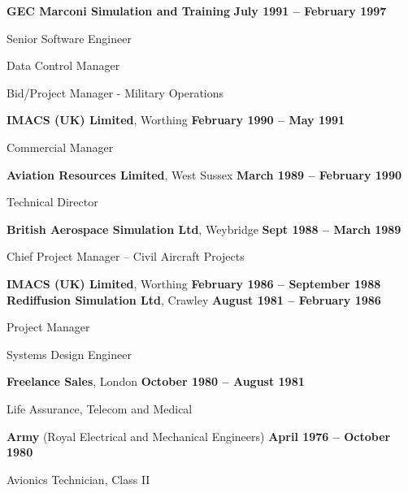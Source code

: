 \documentclass[10pt]{article}
\newenvironment{innerlist}[1][\enskip\textbullet]%
        {\begin{compactitem}[#1]}{\end{compactitem}}
\newcommand{\blankline}{\quad\pagebreak[2]}
\begin{document}
\textbf{GEC Marconi Simulation and Training}        \hfill \textbf{July 1991 -- February 1997}
\begin{innerlist}
\item Senior Software Engineer
\item Data Control Manager
\item Bid/Project Manager - Military Operations
\end{innerlist}
\blankline

\textbf{IMACS (UK) Limited}, Worthing        \hfill \textbf{February 1990 -- May 1991}
\begin{innerlist}
\item Commercial Manager
\end{innerlist}
\blankline

\textbf{Aviation Resources Limited}, West Sussex        \hfill \textbf{March 1989 -- February 1990}
\begin{innerlist}
\item Technical Director
\end{innerlist}
\blankline

\textbf{British Aerospace Simulation Ltd}, Weybridge        \hfill \textbf{Sept 1988 -- March 1989}
\begin{innerlist}
\item Chief Project Manager -- Civil Aircraft Projects
\end{innerlist}
\blankline

\textbf{IMACS (UK) Limited}, Worthing        \hfill \textbf{February 1986 -- September 1988}\\
\textbf{Rediffusion Simulation Ltd}, Crawley        \hfill \textbf{August 1981 -- February 1986}
\begin{innerlist}
\item Project Manager
\item Systems Design Engineer
\end{innerlist}
\blankline

\textbf{Freelance Sales}, London
        \hfill \textbf{October 1980 -- August 1981}
\begin{innerlist}
\item Life Assurance, Telecom and Medical
\end{innerlist}
\blankline

\textbf{Army} (Royal Electrical and Mechanical Engineers)
        \hfill \textbf{April 1976 -- October 1980}
\begin{innerlist}
\item Avionics Technician, Class II
\end{innerlist}
\end{document}
